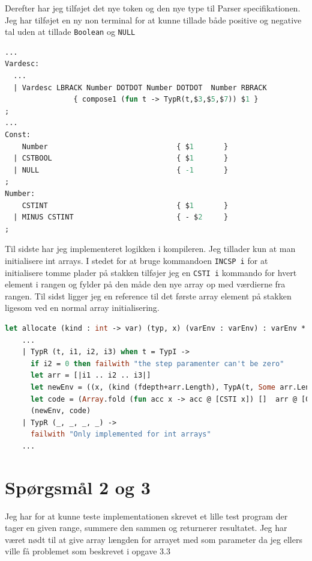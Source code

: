 \documentclass[danish,a4paper]{report}
\begin{document}
Derefter har jeg tilføjet det nye token og den nye type til Parser specifikationen. Jeg har tilføjet en ny non terminal for at kunne tillade både positive og negative tal uden at tillade \texttt{Boolean} og \texttt{NULL}

\begin{lstlisting}[language=ML]
%token BAR DOTDOT
...
Vardesc: 
  ... 
  | Vardesc LBRACK Number DOTDOT Number DOTDOT  Number RBRACK 
                { compose1 (fun t -> TypR(t,$3,$5,$7)) $1 }
;
...
Const:
    Number                              { $1       }
  | CSTBOOL                             { $1       }
  | NULL                                { -1       }
;
Number:
    CSTINT                              { $1       }
  | MINUS CSTINT                        { - $2     }
;
\end{lstlisting}

Til sidste har jeg implementeret logikken i kompileren. Jeg tillader kun at man initialisere int arrays. I stedet for at bruge kommandoen \texttt{INCSP i} for at initialisere tomme plader på stakken tilføjer jeg en \texttt{CSTI i} kommando for hvert element i rangen og fylder på den måde den nye array op med værdierne fra rangen. Til sidst ligger jeg en reference til det første array element på stakken ligesom ved en normal array initialisering.

\begin{lstlisting}[language=ML]
let allocate (kind : int -> var) (typ, x) (varEnv : varEnv) : varEnv * instr list =
    ...
    | TypR (t, i1, i2, i3) when t = TypI ->
      if i2 = 0 then failwith "the step paramenter can't be zero"
      let arr = [|i1 .. i2 .. i3|]
      let newEnv = ((x, (kind (fdepth+arr.Length), TypA(t, Some arr.Length))) :: env, fdepth+arr.Length+1)
      let code = (Array.fold (fun acc x -> acc @ [CSTI x]) []  arr @ [GETSP; CSTI (arr.Length - 1); SUB])
      (newEnv, code) 
    | TypR (_, _, _, _) ->
      failwith "Only implemented for int arrays"
    ...
\end{lstlisting}

\section*{Spørgsmål 2 og 3}

Jeg har for at kunne teste implementationen skrevet et lille test program der tager en given range, summere den sammen og returnerer resultatet. Jeg har været nødt til at give array længden for arrayet med som parameter da jeg ellers ville få problemet som beskrevet i opgave 3.3
\end{document}

